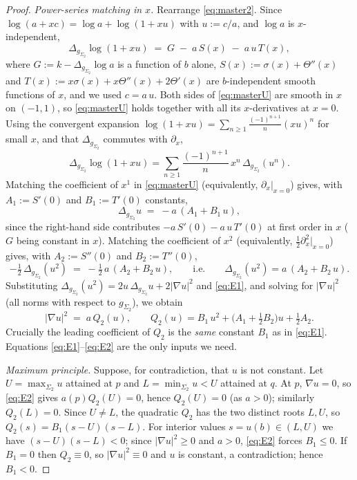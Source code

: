 \documentclass{amsart}
\theoremstyle{definition}
\begin{document}
\begin{proof}
\emph{Power-series matching in $x$.} Rearrange \eqref{eq:master2}. Since
$\log(a+xc)=\log a+\log(1+xu)$ with $u:=c/a$, and $\log a$ is $x$-independent,
\begin{equation}\label{eq:masterU}
  \Delta_{g_{\Sigma_2}}\log(1+xu)
  \;=\; G \;-\; a\,S(x)\;-\;a\,u\,T(x),
\end{equation}
where $G:=k-\Delta_{g_{\Sigma_2}}\log a$ is a function of $b$ alone,
$S(x):=\sigma(x)+\Theta''(x)$ and $T(x):=x\sigma(x)+x\Theta''(x)+2\Theta'(x)$ are
$b$-independent smooth functions of $x$, and we used $c=a\,u$. Both sides of
\eqref{eq:masterU} are smooth in $x$ on $(-1,1)$, so \eqref{eq:masterU} holds
together with all its $x$-derivatives at $x=0$. Using the convergent expansion
$\log(1+xu)=\sum_{n\ge1}\frac{(-1)^{n+1}}{n}(xu)^n$ for small $x$, and that
$\Delta_{g_{\Sigma_2}}$ commutes with $\partial_x$,
\[
  \Delta_{g_{\Sigma_2}}\log(1+xu)=\sum_{n\ge1}\frac{(-1)^{n+1}}{n}\,x^n\,
  \Delta_{g_{\Sigma_2}}(u^n).
\]
Matching the coefficient of $x^1$ in \eqref{eq:masterU} (equivalently,
$\partial_x|_{x=0}$) gives, with $A_1:=S'(0)$ and $B_1:=T'(0)$ constants,
\begin{equation}\label{eq:E1}
  \Delta_{g_{\Sigma_2}}u \;=\; -a\,(A_1+B_1\,u),
\end{equation}
since the right-hand side contributes $-a\,S'(0)-a\,u\,T'(0)$ at first order in
$x$ ($G$ being constant in $x$). Matching the coefficient of $x^2$
(equivalently, $\tfrac12\partial_x^2|_{x=0}$) gives, with $A_2:=S''(0)$ and
$B_2:=T''(0)$,
\[
  -\tfrac12\,\Delta_{g_{\Sigma_2}}(u^2)\;=\;-\tfrac12\,a\,(A_2+B_2\,u),
  \qquad\text{i.e.}\qquad \Delta_{g_{\Sigma_2}}(u^2)=a\,(A_2+B_2\,u).
\]
Substituting $\Delta_{g_{\Sigma_2}}(u^2)=2u\,\Delta_{g_{\Sigma_2}}u+2|\nabla
u|^2$ and \eqref{eq:E1}, and solving for $|\nabla u|^2$ (all norms with respect
to $g_{\Sigma_2}$), we obtain
\begin{equation}\label{eq:E2}
  |\nabla u|^2 \;=\; a\,Q_2(u),\qquad
  Q_2(u)=B_1\,u^2+\bigl(A_1+\tfrac12 B_2\bigr)u+\tfrac12 A_2 .
\end{equation}
Crucially the leading coefficient of $Q_2$ is the \emph{same} constant $B_1$ as
in \eqref{eq:E1}. Equations \eqref{eq:E1}--\eqref{eq:E2} are the only inputs we
need.

\emph{Maximum principle.} Suppose, for contradiction, that $u$ is not constant.
Let $U=\max_{\Sigma_2}u$ attained at $p$ and $L=\min_{\Sigma_2}u<U$ attained at
$q$. At $p$, $\nabla u=0$, so \eqref{eq:E2} gives $a(p)Q_2(U)=0$, hence
$Q_2(U)=0$ (as $a>0$); similarly $Q_2(L)=0$. Since $U\ne L$, the quadratic $Q_2$
has the two distinct roots $L,U$, so $Q_2(s)=B_1(s-U)(s-L)$. For interior values
$s=u(b)\in(L,U)$ we have $(s-U)(s-L)<0$; since $|\nabla u|^2\ge0$ and $a>0$,
\eqref{eq:E2} forces $B_1\le0$. If $B_1=0$ then $Q_2\equiv0$, so $|\nabla
u|^2\equiv0$ and $u$ is constant, a contradiction; hence $B_1<0$.


\end{proof}
\end{document}

